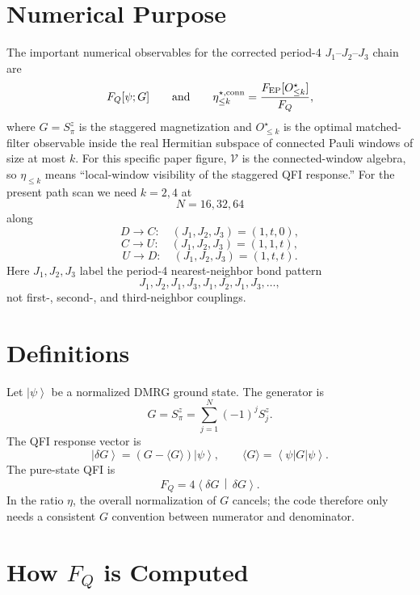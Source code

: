 \documentclass[11pt]{article}
\newcommand{\ket}[1]{\left|#1\right\rangle}
\newcommand{\bra}[1]{\left\langle#1\right|}
\newcommand{\braket}[2]{\left\langle#1\,\middle|\,#2\right\rangle}
\newcommand{\V}{\mathcal V}
\newcommand{\FQ}{F_Q}
\newcommand{\FEP}{F_{\rm EP}}
\newcommand{\dd}{\delta}
\newcommand{\etaK}[1]{\eta^{\star,\mathrm{conn}}_{\le #1}}
\begin{document}
\section{Numerical Purpose}

The important numerical observables for the corrected period-4
$J_1$--$J_2$--$J_3$ chain are
\begin{equation}
  \FQ[\psi;G]
  \qquad\text{and}\qquad
  \etaK{k}
  =
  \frac{\FEP[O^\star_{\le k}]}{\FQ},
\end{equation}
where $G=S^z_\pi$ is the staggered magnetization and
$O^\star_{\le k}$ is the optimal matched-filter observable inside the
real Hermitian subspace of connected Pauli windows of size at most $k$.
For this specific paper figure, $\V$ is the connected-window algebra,
so $\eta_{\le k}$ means ``local-window visibility of the staggered QFI
response.''
For the present path scan we need $k=2,4$ at
\[
  N=16,32,64
\]
along
\[
  D\to C:\quad (J_1,J_2,J_3)=(1,t,0),
\]
\[
  C\to U:\quad (J_1,J_2,J_3)=(1,1,t),
\]
\[
  U\to D:\quad (J_1,J_2,J_3)=(1,t,t).
\]
Here $J_1,J_2,J_3$ label the period-4 nearest-neighbor bond pattern
\[
  J_1,J_2,J_1,J_3,J_1,J_2,J_1,J_3,\ldots,
\]
not first-, second-, and third-neighbor couplings.

\section{Definitions}

Let $\ket{\psi}$ be a normalized DMRG ground state.  The generator is
\begin{equation}
  G
  =
  S^z_\pi
  =
  \sum_{j=1}^{N}(-1)^j S^z_j .
\end{equation}
The QFI response vector is
\begin{equation}
  \ket{\dd G}
  =
  \left(G-\langle G\rangle\right)\ket{\psi},
  \qquad
  \langle G\rangle=\bra{\psi}G\ket{\psi}.
\end{equation}
The pure-state QFI is
\begin{equation}
  \FQ
  =
  4\braket{\dd G}{\dd G}.
\end{equation}
In the ratio $\eta$, the overall normalization of $G$ cancels; the code
therefore only needs a consistent $G$ convention between numerator and
denominator.

\section{How \texorpdfstring{$F_Q$}{FQ} is Computed}
\end{document}
